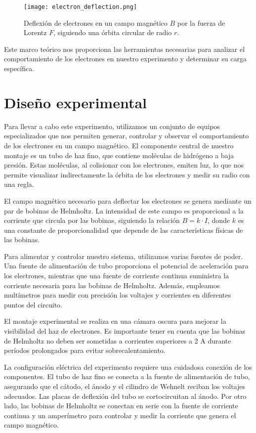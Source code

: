 \documentclass[twocolumn,a4paper,11pt]{scrartcl}
\begin{document}
\begin{figure}[h]
    \centering
    \texttt{[image: electron\_deflection.png]}
    \caption{Deflexión de electrones en un campo magnético $B$ por la fuerza de Lorentz $F$, siguiendo una órbita circular de radio $r$.}
    \label{fig:electron_deflection}
\end{figure}

Este marco teórico nos proporciona las herramientas necesarias para analizar el comportamiento de los electrones en nuestro experimento y determinar su carga específica.
\section{Diseño experimental}

Para llevar a cabo este experimento, utilizamos un conjunto de equipos especializados que nos permiten generar, controlar y observar el comportamiento de los electrones en un campo magnético. El componente central de nuestro montaje es un tubo de haz fino, que contiene moléculas de hidrógeno a baja presión. Estas moléculas, al colisionar con los electrones, emiten luz, lo que nos permite visualizar indirectamente la órbita de los electrones y medir su radio con una regla.

El campo magnético necesario para deflectar los electrones se genera mediante un par de bobinas de Helmholtz. La intensidad de este campo es proporcional a la corriente que circula por las bobinas, siguiendo la relación $B = k \cdot I$, donde $k$ es una constante de proporcionalidad que depende de las características físicas de las bobinas.

Para alimentar y controlar nuestro sistema, utilizamos varias fuentes de poder. Una fuente de alimentación de tubo proporciona el potencial de aceleración para los electrones, mientras que una fuente de corriente continua suministra la corriente necesaria para las bobinas de Helmholtz. Además, empleamos multímetros para medir con precisión los voltajes y corrientes en diferentes puntos del circuito.

El montaje experimental se realiza en una cámara oscura para mejorar la visibilidad del haz de electrones. Es importante tener en cuenta que las bobinas de Helmholtz no deben ser sometidas a corrientes superiores a 2 A durante períodos prolongados para evitar sobrecalentamiento.

La configuración eléctrica del experimento requiere una cuidadosa conexión de los componentes. El tubo de haz fino se conecta a la fuente de alimentación de tubo, asegurando que el cátodo, el ánodo y el cilindro de Wehnelt reciban los voltajes adecuados. Las placas de deflexión del tubo se cortocircuitan al ánodo. Por otro lado, las bobinas de Helmholtz se conectan en serie con la fuente de corriente continua y un amperímetro para controlar y medir la corriente que genera el campo magnético.
\end{document}
